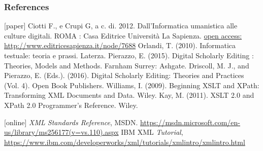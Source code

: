 
\begin{frame}
    \frametitle{References}
    \addtocounter{nframe}{1}
    \begin{thebibliography}{10}

        [paper]
        \tiny{} Ciotti F., e Crupi G, a c. di. 2012. Dall’Informatica umanistica alle culture digitali. ROMA : Casa Editrice Università La Sapienza. \href{http://www.editricesapienza.it/node/7688}{open access: http://www.editricesapienza.it/node/7688}
        \tiny{} Orlandi, T. (2010). Informatica testuale: teoria e prassi. Laterza.
        \tiny{} Pierazzo, E. (2015). Digital Scholarly Editing : Theories, Models and Methods. Farnham Surrey: Ashgate.
        \tiny{} Driscoll, M. J., and Pierazzo, E. (Eds.). (2016). Digital Scholarly Editing: Theories and Practices (Vol. 4). Open Book Publishers.
        \tiny{} Williams, I. (2009). Beginning XSLT and XPath: Transforming XML Documents and Data. Wiley.
        \tiny{} Kay, M. (2011). XSLT 2.0 and XPath 2.0 Programmer’s Reference. Wiley.

        [online]
        \tiny{} \textit{XML Standards Reference}, MSDN. \url{https://msdn.microsoft.com/en-us/library/ms256177(v=vs.110).aspx}
        \tiny{} IBM XML \textit{Tutorial}, \url{https://www.ibm.com/developerworks/xml/tutorials/xmlintro/xmlintro.html}

    \end{thebibliography}

\end{frame}